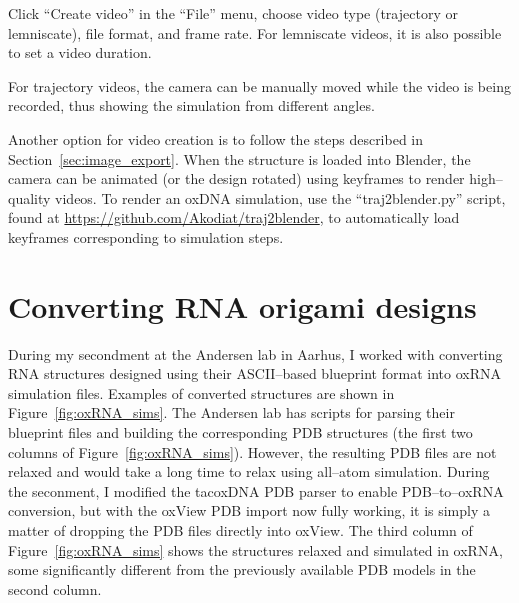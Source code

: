 Click ``Create video'' in the ``File'' menu, choose video type (trajectory or lemniscate), file format, and frame rate. For lemniscate videos, it is also possible to set a video duration.

For trajectory videos, the camera can be manually moved while the video is being recorded, thus showing the simulation from different angles.

Another option for video creation is to follow the steps described in Section~\ref{sec:image_export}. When the structure is loaded into Blender, the camera can be animated (or the design rotated) using keyframes to render high--quality videos. To render an oxDNA simulation, use the ``traj2blender.py'' script, found at \url{https://github.com/Akodiat/traj2blender}, to automatically load keyframes corresponding to simulation steps.

\section{Converting RNA origami designs}
\label{sec:converting_rna_origami}
During my secondment at the Andersen lab in Aarhus, I worked with converting RNA structures designed using their ASCII--based blueprint format into oxRNA simulation files. Examples of converted structures are shown in Figure~\ref{fig:oxRNA_sims}. The Andersen lab has scripts for parsing their blueprint files and building the corresponding PDB structures (the first two columns of Figure~\ref{fig:oxRNA_sims}). However, the resulting PDB files are not relaxed and would take a long time to relax using all--atom simulation. During the seconment, I modified the tacoxDNA \cite{suma2019tacoxdna} PDB parser to enable PDB--to--oxRNA conversion, but with the oxView PDB import now fully working, it is simply a matter of dropping the PDB files directly into oxView. The third column of Figure~\ref{fig:oxRNA_sims} shows the structures relaxed and simulated in oxRNA, some significantly different from the previously available PDB models in the second column.


